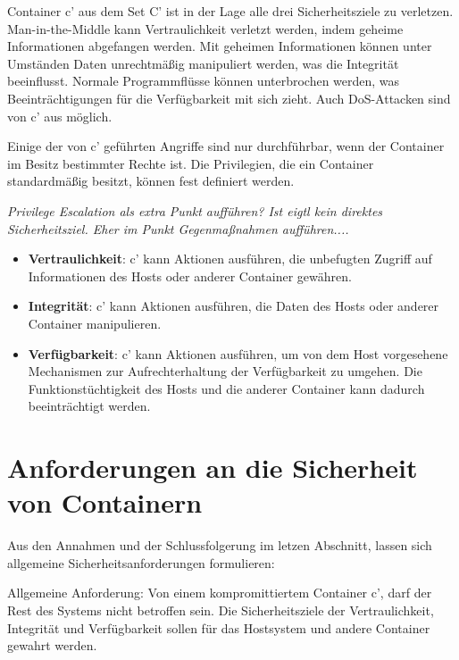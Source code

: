 \documentclass[../main.tex]{subfiles}
\begin{document}
    Container c' aus dem Set C' ist in der Lage alle drei Sicherheitsziele zu verletzen. Man-in-the-Middle kann Vertraulichkeit verletzt werden, indem geheime Informationen abgefangen werden. Mit geheimen Informationen können unter Umständen Daten unrechtmäßig manipuliert werden, was die Integrität beeinflusst. Normale Programmflüsse können unterbrochen werden, was Beeinträchtigungen für die Verfügbarkeit mit sich zieht. Auch DoS-Attacken sind von c' aus möglich.

    Einige der von c' geführten Angriffe sind nur durchführbar, wenn der Container im Besitz bestimmter Rechte ist. Die Privilegien, die ein Container standardmäßig besitzt, können fest definiert werden.

    \emph{Privilege Escalation als extra Punkt aufführen? Ist eigtl kein direktes Sicherheitsziel. Eher im Punkt Gegenmaßnahmen aufführen....}

    \begin{itemize}
      \item \textbf{Vertraulichkeit}: c' kann Aktionen ausführen, die unbefugten Zugriff auf Informationen des Hosts oder anderer Container gewähren.
      \item \textbf{Integrität}: c' kann Aktionen ausführen, die Daten des Hosts oder anderer Container manipulieren.
      \item \textbf{Verfügbarkeit}: c' kann Aktionen ausführen, um von dem Host vorgesehene Mechanismen zur Aufrechterhaltung der Verfügbarkeit zu umgehen. Die Funktionstüchtigkeit des Hosts und die anderer Container kann dadurch beeinträchtigt werden.
    \end{itemize}


  \section{Anforderungen an die Sicherheit von Containern}
    Aus den Annahmen und der Schlussfolgerung im letzen Abschnitt, lassen sich allgemeine Sicherheitsanforderungen formulieren:

    Allgemeine Anforderung: Von einem kompromittiertem Container c', darf der Rest des Systems nicht betroffen sein. Die Sicherheitsziele der Vertraulichkeit, Integrität und Verfügbarkeit sollen für das Hostsystem und andere Container gewahrt werden.
\end{document}
